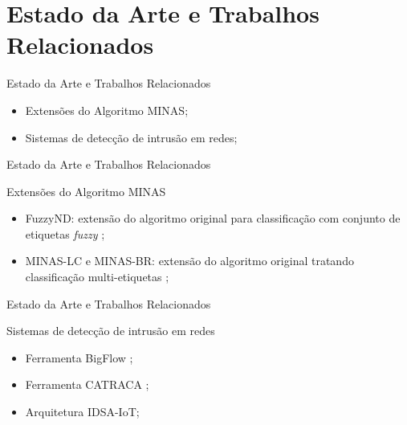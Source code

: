 \documentclass[aspectratio=43,10pt]{beamer}
\begin{document}
\section{Estado da Arte e Trabalhos Relacionados}
\begin{frame}[fragile]{Estado da Arte e Trabalhos Relacionados}
\begin{itemize}
\item Extensões do Algoritmo MINAS;
\item Sistemas de detecção de intrusão em redes;
\end{itemize}
\end{frame}

\begin{frame}[fragile]{Estado da Arte e Trabalhos Relacionados}
\begin{alertblock}{Extensões do Algoritmo MINAS}
  \begin{itemize}
    \item FuzzyND: extensão do algoritmo original para classificação com
    conjunto de etiquetas \emph{fuzzy} \cite{DaSilva2018,DaSilva2018thesis};
    \item MINAS-LC e MINAS-BR: extensão do algoritmo original tratando
    classificação multi-etiquetas \cite{Costa2019,Costa2019thesis};
  \end{itemize}
\end{alertblock}
\end{frame}

\newcommand{\idsiot}{IDSA-IoT\xspace}

\begin{frame}[fragile]{Estado da Arte e Trabalhos Relacionados}
\begin{alertblock}{Sistemas de detecção de intrusão em redes}
  \begin{itemize}
    \item Ferramenta BigFlow \cite{Viegas2019};
    \item Ferramenta CATRACA \cite{Lopez2018};
    \item Arquitetura \idsiot \cite{Cassales2019a};
  \end{itemize}
\end{alertblock}
\end{frame}
\end{document}
